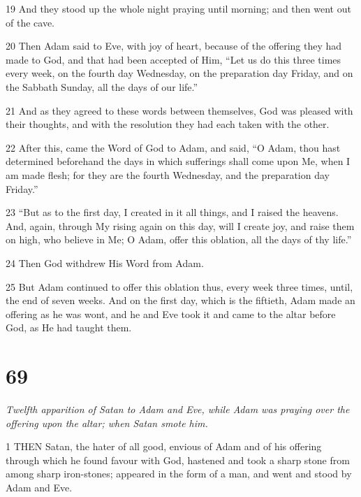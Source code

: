 \par 19 And they stood up the whole night praying until morning; and then went out of the cave.

\par 20 Then Adam said to Eve, with joy of heart, because of the offering they had made to God, and that had been accepted of Him, “Let us do this three times every week, on the fourth day Wednesday, on the preparation day Friday, and on the Sabbath Sunday, all the days of our life.”

\par 21 And as they agreed to these words between themselves, God was pleased with their thoughts, and with the resolution they had each taken with the other.

\par 22 After this, came the Word of God to Adam, and said, “O Adam, thou hast determined beforehand the days in which sufferings shall come upon Me, when I am made flesh; for they are the fourth Wednesday, and the preparation day Friday.”

\par 23 “But as to the first day, I created in it all things, and I raised the heavens. And, again, through My rising again on this day, will I create joy, and raise them on high, who believe in Me; O Adam, offer this oblation, all the days of thy life.”

\par 24 Then God withdrew His Word from Adam.

\par 25 But Adam continued to offer this oblation thus, every week three times, until, the end of seven weeks. And on the first day, which is the fiftieth, Adam made an offering as he was wont, and he and Eve took it and came to the altar before God, as He had taught them.



\chapter{69}

\par \textit{Twelfth apparition of Satan to Adam and Eve, while Adam was praying over the offering upon the altar; when Satan smote him.}

\par 1 THEN Satan, the hater of all good, envious of Adam and of his offering through which he found favour with God, hastened and took a sharp stone from among sharp iron-stones; appeared in the form of a man, and went and stood by Adam and Eve.

